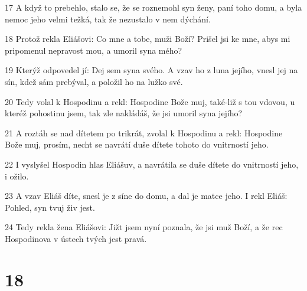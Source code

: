 \par 17 A když to prebehlo, stalo se, že se roznemohl syn ženy, paní toho domu, a byla nemoc jeho velmi težká, tak že nezustalo v nem dýchání.
\par 18 Protož rekla Eliášovi: Co mne a tobe, muži Boží? Prišel jsi ke mne, abys mi pripomenul nepravost mou, a umoril syna mého?
\par 19 Kterýž odpovedel jí: Dej sem syna svého. A vzav ho z luna jejího, vnesl jej na sín, kdež sám prebýval, a položil ho na lužko své.
\par 20 Tedy volal k Hospodinu a rekl: Hospodine Bože muj, také-liž s tou vdovou, u kteréž pohostinu jsem, tak zle nakládáš, že jsi umoril syna jejího?
\par 21 A roztáh se nad dítetem po trikrát, zvolal k Hospodinu a rekl: Hospodine Bože muj, prosím, necht se navrátí duše dítete tohoto do vnitrností jeho.
\par 22 I vyslyšel Hospodin hlas Eliášuv, a navrátila se duše dítete do vnitrností jeho, i ožilo.
\par 23 A vzav Eliáš díte, snesl je z síne do domu, a dal je matce jeho. I rekl Eliáš: Pohled, syn tvuj živ jest.
\par 24 Tedy rekla žena Eliášovi: Jižt jsem nyní poznala, že jsi muž Boží, a že rec Hospodinova v ústech tvých jest pravá.

\chapter{18}


